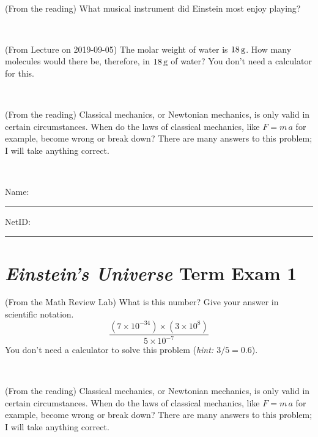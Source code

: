 \documentclass[12pt, letterpaper]{article}
\begin{document}
\vfill ~

\begin{problem} (From the reading)
What musical instrument did Einstein most enjoy playing?
\end{problem}


\vfill ~

\begin{problem} (From Lecture on 2019-09-05)
The molar weight of water is $18\,\mathrm{g}$. How many molecules would there
be, therefore, in $18\,\mathrm{g}$ of water? You don't need a calculator for
this.
\end{problem}


\vfill ~

\begin{problem} (From the reading)
Classical mechanics, or Newtonian mechanics, is only valid in certain
circumstances. When do the laws of classical mechanics, like $F =
m\,a$ for example, become wrong or break down? There are many answers
to this problem; I will take anything correct.
\end{problem}


\vfill ~


\cleardoublepage



\noindent
Name: \rule[-1ex]{0.60\textwidth}{0.1pt}
NetID: \rule[-1ex]{0.20\textwidth}{0.1pt}

\section*{\textsl{Einstein's Universe} Term Exam 1}
\setcounter{problem}{1}


\begin{problem} (From the Math Review Lab)
What is this number? Give your answer in scientific notation.
$$
\frac{(7\times10^{-34})\times(3\times10^8)}{5\times10^{-7}}
$$
You don't need a calculator to solve this problem (\textit{hint: $3/5=0.6$}).
\end{problem}


\vfill ~

\begin{problem} (From the reading)
Classical mechanics, or Newtonian mechanics, is only valid in certain
circumstances. When do the laws of classical mechanics, like $F =
m\,a$ for example, become wrong or break down? There are many answers
to this problem; I will take anything correct.
\end{problem}


\vfill ~
\end{document}
